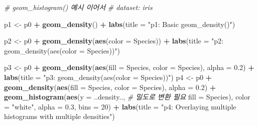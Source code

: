 \documentclass[
  11pt,
]{krantz}
\newenvironment{Shaded}{\begin{snugshade}}{\end{snugshade}}
\newcommand{\CommentTok}[1]{\textcolor[rgb]{0.37,0.37,0.37}{\textit{#1}}}
\newcommand{\DataTypeTok}[1]{\textcolor[rgb]{0.27,0.27,0.27}{#1}}
\newcommand{\DecValTok}[1]{\textcolor[rgb]{0.06,0.06,0.06}{#1}}
\newcommand{\FloatTok}[1]{\textcolor[rgb]{0.06,0.06,0.06}{#1}}
\newcommand{\KeywordTok}[1]{\textcolor[rgb]{0.27,0.27,0.27}{\textbf{#1}}}
\newcommand{\NormalTok}[1]{#1}
\newcommand{\OperatorTok}[1]{\textcolor[rgb]{0.43,0.43,0.43}{\textbf{#1}}}
\newcommand{\StringTok}[1]{\textcolor[rgb]{0.5,0.5,0.5}{#1}}
\begin{document}
\normalsize

\footnotesize

\begin{Shaded}
\begin{Highlighting}[]
\CommentTok{# geom_histogram() 예시 이어서}
\CommentTok{# dataset: iris}

\NormalTok{p1 <-}\StringTok{ }\NormalTok{p0 }\OperatorTok{+}\StringTok{ }
\StringTok{  }\KeywordTok{geom_density}\NormalTok{() }\OperatorTok{+}\StringTok{ }
\StringTok{  }\KeywordTok{labs}\NormalTok{(}\DataTypeTok{title =} \StringTok{"p1: Basic geom_density()"}\NormalTok{)}

\NormalTok{p2 <-}\StringTok{ }\NormalTok{p0 }\OperatorTok{+}\StringTok{ }
\StringTok{  }\KeywordTok{geom_density}\NormalTok{(}\KeywordTok{aes}\NormalTok{(}\DataTypeTok{color =}\NormalTok{ Species)) }\OperatorTok{+}\StringTok{ }
\StringTok{  }\KeywordTok{labs}\NormalTok{(}\DataTypeTok{title =} \StringTok{"p2: geom_density(aes(color = Species))"}\NormalTok{)}

\NormalTok{p3 <-}\StringTok{ }\NormalTok{p0 }\OperatorTok{+}\StringTok{ }
\StringTok{  }\KeywordTok{geom_density}\NormalTok{(}\KeywordTok{aes}\NormalTok{(}\DataTypeTok{fill =}\NormalTok{ Species, }
                   \DataTypeTok{color =}\NormalTok{ Species), }
               \DataTypeTok{alpha =} \FloatTok{0.2}\NormalTok{) }\OperatorTok{+}\StringTok{ }
\StringTok{  }\KeywordTok{labs}\NormalTok{(}\DataTypeTok{title =} \StringTok{"p3: geom_density(aes(color = Species))"}\NormalTok{)}
\NormalTok{p4 <-}\StringTok{ }\NormalTok{p0 }\OperatorTok{+}\StringTok{ }
\StringTok{  }\KeywordTok{geom_density}\NormalTok{(}\KeywordTok{aes}\NormalTok{(}\DataTypeTok{fill =}\NormalTok{ Species, }
                   \DataTypeTok{color =}\NormalTok{ Species), }
               \DataTypeTok{alpha =} \FloatTok{0.2}\NormalTok{) }\OperatorTok{+}\StringTok{ }
\StringTok{  }\KeywordTok{geom_histogram}\NormalTok{(}\KeywordTok{aes}\NormalTok{(}\DataTypeTok{y =}\NormalTok{ ..density.., }\CommentTok{# 밀도로 변환 필요}
                     \DataTypeTok{fill =}\NormalTok{ Species), }
                 \DataTypeTok{color =} \StringTok{"white"}\NormalTok{, }
                 \DataTypeTok{alpha =} \FloatTok{0.3}\NormalTok{, }
                 \DataTypeTok{bins =} \DecValTok{20}\NormalTok{) }\OperatorTok{+}\StringTok{ }
\StringTok{  }\KeywordTok{labs}\NormalTok{(}\DataTypeTok{title =} \StringTok{"p4: Overlaying multiple histograms with multiple densities"}\NormalTok{)}
\end{Highlighting}
\end{Shaded}
\end{document}
